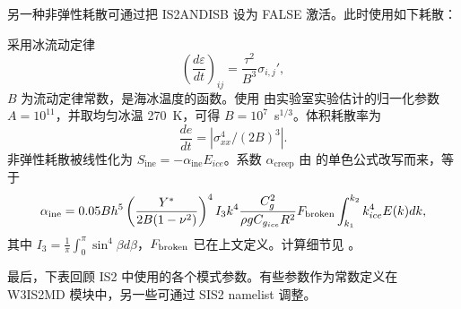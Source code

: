 另一种非弹性耗散可通过把 {\code IS2ANDISB} 设为 {\code FALSE} 激活。此时使用如下耗散：

采用冰流动定律
\begin{equation}
\left(\frac{d\varepsilon}{dt}\right)_{ij}=\frac{\tau^2}{B^3}\sigma_{i,j}',
\end{equation}
$B$ 为流动定律常数，是海冰温度的函数。使用 \cite{art:Cea98} 由实验室实验估计的归一化参数 $A=10^{11}$，并取均匀冰温 270~K，可得 $B=10^7$~s$^{1/3}$。体积耗散率为
\begin{equation}
\frac{de}{dt}= | \sigma_{xx}^{4}/(2B)^3 |.
\end{equation}
非弹性耗散被线性化为 $S_{\mathrm{ine}}=-\alpha_{\mathrm{ine}} E_{ice}$。系数 $\alpha_{\mathrm{creep}}$ 由 \cite{art:Wad73} 的单色公式改写而来，等于
\begin{equation}
\alpha_{\mathrm{ine}}=0.05 B h^5 \left(\frac{Y^*}{2B(1-\nu^2)}\right)^{4} I_3 k^4 \frac{C_g^2}{\rho g C_{g_{ice}}R^2} F_{\rm broken} \int_{k_1}^{k_2} k_{ice}^4 E(k)dk, 
\label{eq:alpha_creep}
\end{equation}
其中 $I_3=\frac{1}{\pi} \int_0^\pi \sin^{4}\beta d\beta$，$F_{\rm broken}$ 已在上文定义。计算细节见 \cite{art:Bea18}。

最后，下表回顾 IS2 中使用的各个模式参数。有些参数作为常数定义在 {\code W3IS2MD} 模块中，另一些可通过 {\F SIS2} namelist 调整。

